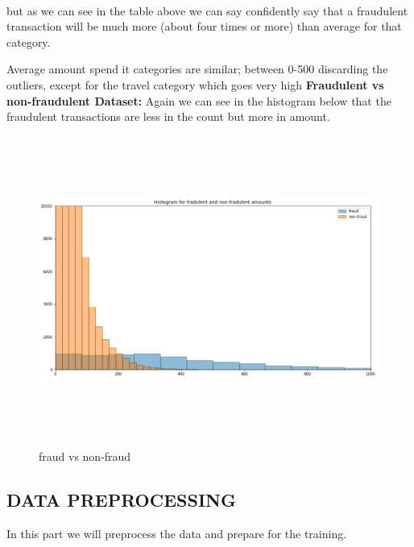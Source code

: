 \documentclass[12pt]{article}
\begin{document}
\\
 but as we can see in the table above we can say confidently say that a fraudulent transaction will be much more (about four times or more) than average for that category.
 \item Average amount spend it categories are similar; between 0-500 discarding the outliers, except for the travel category which goes very high
\newpage
\textbf{Fraudulent vs non-fraudulent Dataset:}
Again we can see in the histogram below that the fraudulent transactions are less in the count but more in amount.

          
           \begin{figure}[htp]
    \centering
                \includegraphics[height=4in]{i4.png}

    \caption{fraud vs non-fraud}
    \label{fig:galaxy}
\end{figure}

\newpage
\subsection{DATA PREPROCESSING}
  In this part we will preprocess the data and prepare for the training.\\
 
\end{document}
